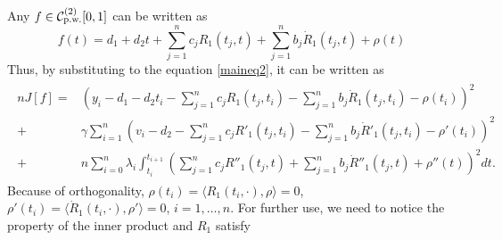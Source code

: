 Any $f\in\mathcal{C}_{\mbox{\scriptsize p.w.}}^{(2)}[0,1]$ can be written as 
\begin{equation}\label{GaussianProcessFunctionF2}
f(t)=d_1+d_2t+\sum_{j=1}^{n}c_jR_1(t_j,t)+\sum_{j=1}^{n}b_j\dot{R}_1(t_j,t) +\rho(t)
\end{equation}
Thus, by substituting to the equation \eqref{maineq2}, it can be written as 
\begin{align}\label{GassianProcessRawequation2}
\begin{split}
nJ[f]=& \left( y_i - d_1-d_2t_i-\sum_{j=1}^{n}c_jR_1(t_j,t_i)-\sum_{j=1}^{n}b_j\dot{R}_1(t_j,t_i)-\rho(t_i) \right) ^2\\
+&\gamma\sum_{i=1}^{n} \left( v_i - d_2-\sum_{j=1}^{n}c_jR'_1(t_j,t_i)-\sum_{j=1}^{n}b_j\dot{R}'_1(t_j,t_i)-\rho'(t_i) \right) ^2\\
+&n \sum_{i=0}^{n}\lambda_i \int_{t_i}^{t_{i+1}}  \left( \sum_{j=1}^{n}c_jR''_1(t_j,t)+\sum_{j=1}^{n}b_j\dot{R}''_1(t_j,t)+\rho''(t)\right)^2dt. 
\end{split}
\end{align}
Because of orthogonality, $\rho(t_i) = \langle R_1(t_i,\cdot),\rho\rangle=0$, $\rho'(t_i) = \langle \dot{R}_1(t_i,\cdot),\rho'\rangle=0$, $i=1,\ldots,n$. 
For further use, we need to notice the property of the inner product and $R_1$ satisfy 
